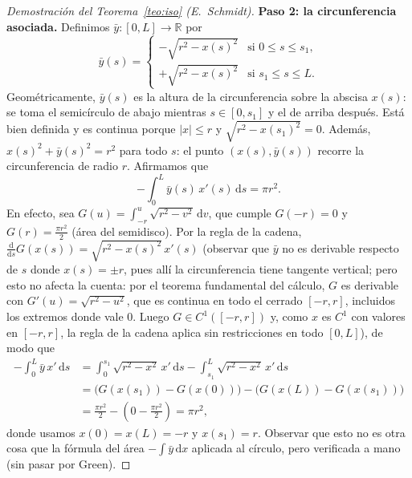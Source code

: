 \documentclass[12pt,a4paper]{article}
\theoremstyle{profesional}
\theoremstyle{definicion-style}
\newcommand{\R}{\mathbb{R}}
\newcommand{\abs}[1]{\left| #1 \right|}
\begin{document}
\begin{proof}[Demostración del Teorema~\ref{teo:iso} (E.~Schmidt)]
    \textbf{Paso 2: la circunferencia asociada.}
    Definimos \( \bar y : [0, L] \to \R \) por
    \[
        \bar y(s) = \begin{cases}
            -\sqrt{r^2 - x(s)^2} & \text{si } 0 \leq s \leq s_1, \\
            +\sqrt{r^2 - x(s)^2} & \text{si } s_1 \leq s \leq L.
        \end{cases}
    \]
    Geométricamente, \( \bar y(s) \) es la altura de la circunferencia sobre la abscisa \( x(s) \): se toma el semicírculo de abajo mientras \( s \in [0, s_1] \) y el de arriba después.
    Está bien definida y es continua porque \( \abs{x} \leq r \) y \( \sqrt{r^2 - x(s_1)^2} = 0 \). Además, \( x(s)^2 + \bar y(s)^2 = r^2 \) para todo \( s \): el punto \( (x(s), \bar y(s)) \) recorre la circunferencia de radio \( r \).
    Afirmamos que
    \[
        -\int_0^L \bar y(s) \, x'(s) \, \mathrm{d}s = \pi r^2.
    \]
    En efecto, sea \( G(u) = \int_{-r}^{u} \sqrt{r^2 - v^2} \, \mathrm{d}v \), que cumple \( G(-r) = 0 \) y \( G(r) = \frac{\pi r^2}{2} \) (área del semidisco). Por la regla de la cadena,
    \( \frac{\mathrm{d}}{\mathrm{d}s} G(x(s)) = \sqrt{r^2 - x(s)^2} \, x'(s) \) (observar que \( \bar y \) no es derivable respecto de \( s \) donde \( x(s) = \pm r \), pues allí la circunferencia tiene tangente vertical; pero esto no afecta la cuenta: por el teorema fundamental del cálculo, \( G \) es derivable con \( G'(u) = \sqrt{r^2 - u^2} \), que es continua en todo el cerrado \( [-r, r] \), incluidos los extremos donde vale \( 0 \). Luego \( G \in C^1([-r, r]) \) y, como \( x \) es \( C^1 \) con valores en \( [-r, r] \), la regla de la cadena aplica sin restricciones en todo \( [0, L] \)), de modo que
    \begin{align*}
        -\int_0^L \bar y \, x' \, \mathrm{d}s & = \int_0^{s_1} \sqrt{r^2 - x^2} \, x' \, \mathrm{d}s - \int_{s_1}^{L} \sqrt{r^2 - x^2} \, x' \, \mathrm{d}s \\
                                              & = \big( G(x(s_1)) - G(x(0)) \big) - \big( G(x(L)) - G(x(s_1)) \big)                                         \\
                                              & = \frac{\pi r^2}{2} - \left( 0 - \frac{\pi r^2}{2} \right) = \pi r^2,
    \end{align*}
    donde usamos \( x(0) = x(L) = -r \) y \( x(s_1) = r \). Observar que esto no es otra cosa que la fórmula del área \( -\int \bar y \, \mathrm{d}x \) aplicada al círculo, pero verificada a mano (sin pasar por Green).


\end{proof}
\end{document}
